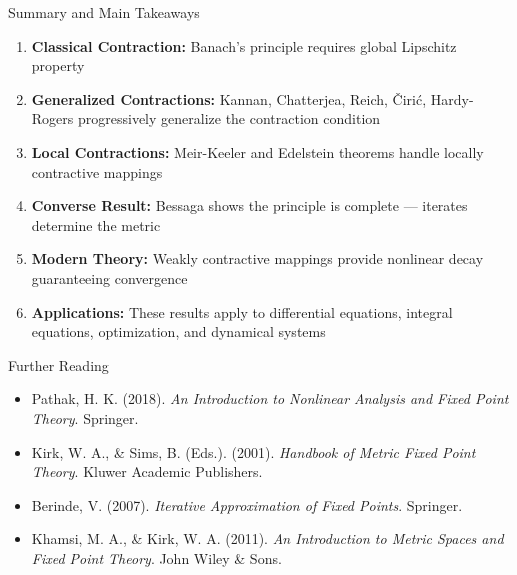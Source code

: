 \documentclass[aspectratio=169,10pt]{beamer}
\begin{document}
\begin{frame}{Summary and Main Takeaways}
  \begin{enumerate}
    \item \textbf{Classical Contraction:} Banach's principle requires global Lipschitz property

    \vspace{0.2cm}

    \item \textbf{Generalized Contractions:} Kannan, Chatterjea, Reich, Čirić, Hardy-Rogers
      progressively generalize the contraction condition

    \vspace{0.2cm}

    \item \textbf{Local Contractions:} Meir-Keeler and Edelstein theorems handle locally
      contractive mappings

    \vspace{0.2cm}

    \item \textbf{Converse Result:} Bessaga shows the principle is complete --- iterates
      determine the metric

    \vspace{0.2cm}

    \item \textbf{Modern Theory:} Weakly contractive mappings provide nonlinear decay
      guaranteeing convergence

    \vspace{0.2cm}

    \item \textbf{Applications:} These results apply to differential equations, integral equations,
      optimization, and dynamical systems
  \end{enumerate}
\end{frame}

\begin{frame}{Further Reading}
  \begin{itemize}
    \item Pathak, H. K. (2018). \textit{An Introduction to Nonlinear Analysis and Fixed Point Theory}.
      Springer.

    \vspace{0.3cm}

    \item Kirk, W. A., \& Sims, B. (Eds.). (2001). \textit{Handbook of Metric Fixed Point Theory}.
      Kluwer Academic Publishers.

    \vspace{0.3cm}

    \item Berinde, V. (2007). \textit{Iterative Approximation of Fixed Points}. Springer.

    \vspace{0.3cm}

    \item Khamsi, M. A., \& Kirk, W. A. (2011). \textit{An Introduction to Metric Spaces and
      Fixed Point Theory}. John Wiley \& Sons.
  \end{itemize}
\end{frame}
\end{document}

